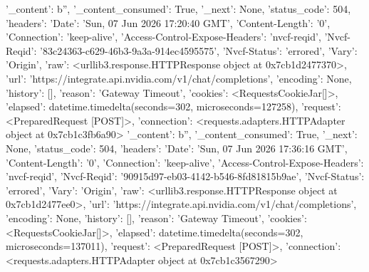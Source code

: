 
{'_content': b'', '_content_consumed': True, '_next': None, 'status_code': 504, 'headers': {'Date': 'Sun, 07 Jun 2026 17:20:40 GMT', 'Content-Length': '0', 'Connection': 'keep-alive', 'Access-Control-Expose-Headers': 'nvcf-reqid', 'Nvcf-Reqid': '83c24363-c629-46b3-9a3a-914ec4595575', 'Nvcf-Status': 'errored', 'Vary': 'Origin'}, 'raw': <urllib3.response.HTTPResponse object at 0x7cb1d2477370>, 'url': 'https://integrate.api.nvidia.com/v1/chat/completions', 'encoding': None, 'history': [], 'reason': 'Gateway Timeout', 'cookies': <RequestsCookieJar[]>, 'elapsed': datetime.timedelta(seconds=302, microseconds=127258), 'request': <PreparedRequest [POST]>, 'connection': <requests.adapters.HTTPAdapter object at 0x7cb1c3fb6a90>}
{'_content': b'', '_content_consumed': True, '_next': None, 'status_code': 504, 'headers': {'Date': 'Sun, 07 Jun 2026 17:36:16 GMT', 'Content-Length': '0', 'Connection': 'keep-alive', 'Access-Control-Expose-Headers': 'nvcf-reqid', 'Nvcf-Reqid': '90915d97-eb03-4142-b546-8fd81815b9ae', 'Nvcf-Status': 'errored', 'Vary': 'Origin'}, 'raw': <urllib3.response.HTTPResponse object at 0x7cb1d2477ee0>, 'url': 'https://integrate.api.nvidia.com/v1/chat/completions', 'encoding': None, 'history': [], 'reason': 'Gateway Timeout', 'cookies': <RequestsCookieJar[]>, 'elapsed': datetime.timedelta(seconds=302, microseconds=137011), 'request': <PreparedRequest [POST]>, 'connection': <requests.adapters.HTTPAdapter object at 0x7cb1c3567290>}
